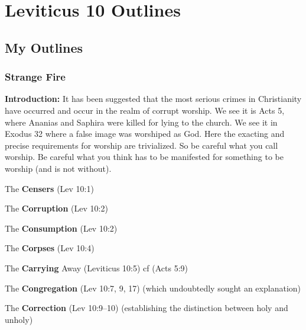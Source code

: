 \section{Leviticus 10 Outlines}

\subsection{My Outlines}

\subsubsection{Strange Fire}
\textbf{Introduction: }It has been suggested that the most serious crimes in Christianity have occurred and occur in the realm of corrupt worship.  We see it is Acts 5, where Ananias and Saphira were killed for lying  to the church.  We see it in Exodus 32 where a false image was worshiped as God. Here the exacting and precise requirements for worship are trivialized. So be careful what you call worship. Be careful what you think has to be manifested for something to be worship (and is not without). 
\begin{compactenum}[I.][7]
	\item The \textbf{Censers} (Lev 10:1)
	\item The \textbf{Corruption} (Lev 10:2)
	\item The \textbf{Consumption} (Lev 10:2)
	\item The \textbf{Corpses}  (Lev 10:4)
	\item The \textbf{Carrying} Away (Leviticus 10:5) cf (Acts 5:9)
	\item The \textbf{Congregation}  (Lev 10:7, 9, 17) (which undoubtedly sought an explanation)
	\item The \textbf{Correction}  (Lev 10:9--10) (establishing the distinction between holy and unholy)
\end{compactenum}
